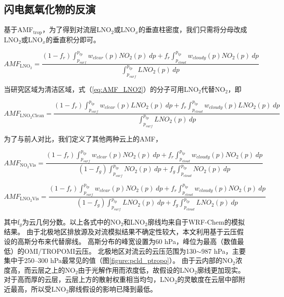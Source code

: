 \subsection{闪电氮氧化物的反演} \label{section:lnox}

基于AMF$_{\textrm{trop}}$，为了得到对流层LNO$_2$或LNO$_x$的垂直柱密度，我们只需将分母改成LNO$_2$或LNO$_x$的垂直积分即可。

\begin{equation} \label{eq:AMF_LNO2}
AMF_{\textrm{LNO$_2$}} = \frac{(1-f_r) \int_{p_{surf}}^{p_{tp}} w_{clear}(p) NO_2(p) \: dp + f_r \int_{p_{cloud}}^{p_{tp}} w_{cloudy}(p) NO_2(p) \: dp}{\int_{p_{surf}}^{p_{tp}} LNO_2(p) \: dp}
\end{equation}

当研究区域为清洁区域，式（\ref{eq:AMF_LNO2}）的分子可用LNO$_2$代替NO$_2$，即

\begin{equation} \label{eq:AMF_LNO2}
AMF_{\textrm{LNO$_2$Clean}} = \frac{(1-f_r) \int_{p_{surf}}^{p_{tp}} w_{clear}(p) LNO_2(p) \: dp + f_r \int_{p_{cloud}}^{p_{tp}} w_{cloudy}(p) LNO_2(p) \: dp}{\int_{p_{surf}}^{p_{tp}} LNO_2(p) \: dp}
\end{equation}

为了与前人对比，我们定义了其他两种云上的AMF，

\begin{equation} \label{eq:AMF_NO2Vis}
AMF_{\textrm{NO$_2$Vis}} = \frac{(1-f_r) \int_{p_{surf}}^{p_{tp}} w_{clear}(p) NO_2(p) \: dp + f_r \int_{p_{cloud}}^{p_{tp}} w_{cloudy}(p) NO_2(p) \: dp}{(1-f_g) \int_{p_{surf}}^{p_{tp}} NO_2(p) \: dp + f_g \int_{p_{cloud}}^{p_{tp}} NO_2(p) \: dp}
\end{equation}

\begin{equation} \label{eq:AMF_LNO2Vis}
AMF_{\textrm{LNO$_2$Vis}} = \frac{(1-f_r) \int_{p_{surf}}^{p_{tp}} w_{clear}(p) NO_2(p) \: dp + f_r \int_{p_{cloud}}^{p_{tp}} w_{cloudy}(p) NO_2(p) \: dp}{(1-f_g) \int_{p_{surf}}^{p_{tp}} LNO_2(p) \: dp + f_g \int_{p_{cloud}}^{p_{tp}} LNO_2(p) \: dp}
\end{equation}

其中f$_g$为云几何分数。以上各式中的NO$_2$和LNO$_2$廓线均来自于WRF-Chem的模拟结果。
由于北极地区排放源及对流模拟结果不确定性较大，本文利用基于云压假设的高斯分布来代替廓线。
高斯分布的峰宽设置为60 hPa，峰位为最高（数值最低）的OMI/TROPOMI云压。
北极地区对流云的云压范围为130$\sim$987 hPa，主要集中于250--300 hPa最常见的值（图\ref{figure:pcld_ptropo}）。
由于云内部的NO$_2$浓度高，而云层之上的NO$_2$由于光解作用而浓度低，故假设的LNO$_2$廓线更加现实\citep{Beirle.2009}。
对于高而厚的云层，云层上方的散射权重相当均匀，LNO$_2$的灵敏度在云层中部附近最高，所以受LNO$_2$廓线假设的影响已降到最低\citep{Laughner.2017}。

